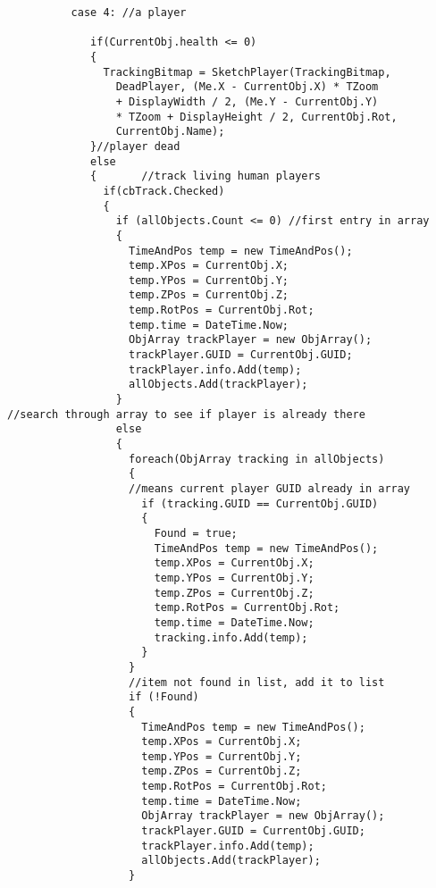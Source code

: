 \begin{lstlisting}
          case 4: //a player

             if(CurrentObj.health <= 0)
             {
               TrackingBitmap = SketchPlayer(TrackingBitmap, 
                 DeadPlayer, (Me.X - CurrentObj.X) * TZoom 
                 + DisplayWidth / 2, (Me.Y - CurrentObj.Y) 
                 * TZoom + DisplayHeight / 2, CurrentObj.Rot, 
                 CurrentObj.Name);
             }//player dead
             else
             {       //track living human players
               if(cbTrack.Checked)
               {
                 if (allObjects.Count <= 0) //first entry in array
                 {
                   TimeAndPos temp = new TimeAndPos();
                   temp.XPos = CurrentObj.X;
                   temp.YPos = CurrentObj.Y;
                   temp.ZPos = CurrentObj.Z;
                   temp.RotPos = CurrentObj.Rot;
                   temp.time = DateTime.Now;       
                   ObjArray trackPlayer = new ObjArray();
                   trackPlayer.GUID = CurrentObj.GUID;
                   trackPlayer.info.Add(temp);
                   allObjects.Add(trackPlayer);
                 }
//search through array to see if player is already there                
                 else                    
                 {
                   foreach(ObjArray tracking in allObjects)
                   {
                   //means current player GUID already in array
                     if (tracking.GUID == CurrentObj.GUID)
                     {
                       Found = true;
                       TimeAndPos temp = new TimeAndPos();
                       temp.XPos = CurrentObj.X;
                       temp.YPos = CurrentObj.Y;
                       temp.ZPos = CurrentObj.Z;
                       temp.RotPos = CurrentObj.Rot;
                       temp.time = DateTime.Now;
                       tracking.info.Add(temp);
                     }
                   }
                   //item not found in list, add it to list
                   if (!Found)     
                   {
                     TimeAndPos temp = new TimeAndPos();
                     temp.XPos = CurrentObj.X;
                     temp.YPos = CurrentObj.Y;
                     temp.ZPos = CurrentObj.Z;
                     temp.RotPos = CurrentObj.Rot;
                     temp.time = DateTime.Now;      
                     ObjArray trackPlayer = new ObjArray();
                     trackPlayer.GUID = CurrentObj.GUID;
                     trackPlayer.info.Add(temp);
                     allObjects.Add(trackPlayer);
                   }

\end{lstlisting}
